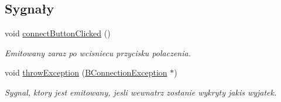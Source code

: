 \subsection*{Sygnały}
\begin{CompactItemize}
\item 
void \hyperlink{class_b_connection_widget_2eef5117ae0e5b76ca02a86d00fbd70a}{connectButtonClicked} ()
\begin{CompactList}\small\item\em Emitowany zaraz po wcisniecu przycisku polaczenia. \item\end{CompactList}\item 
void \hyperlink{class_b_connection_widget_8d14da5ae492c481f88adfbcdabf47d2}{throwException} (\hyperlink{class_b_connection_exception}{BConnectionException} $\ast$)
\begin{CompactList}\small\item\em Sygnal, ktory jest emitowany, jesli wewnatrz zostanie wykryty jakis wyjatek. \item\end{CompactList}\end{CompactItemize}
